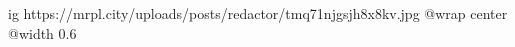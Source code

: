  
 
 
 
 

\ifcmt
  ig https://mrpl.city/uploads/posts/redactor/tmq71njgsjh8x8kv.jpg
  @wrap center
  @width 0.6
\fi
